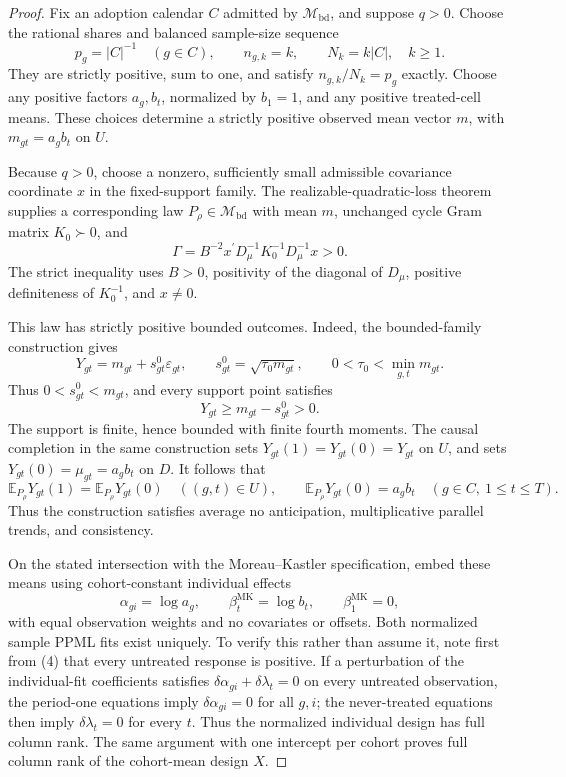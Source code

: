 \documentclass{article}
\begin{document}
\begin{proof}
Fix an adoption calendar \(C\) admitted by \(\mathcal M_{\mathrm{bd}}\), and suppose \(q>0\).  Choose the rational shares and balanced sample-size sequence
\[
p_g=|C|^{-1}\quad(g\in C),
\qquad
n_{g,k}=k,
\qquad
N_k=k|C|,
\quad k\ge1.                                                            \tag{1}
\]
They are strictly positive, sum to one, and satisfy
\(n_{g,k}/N_k=p_g\) exactly.  Choose any positive factors \(a_g,b_t\), normalized by \(b_1=1\), and any positive treated-cell means.  These choices determine a strictly positive observed mean vector \(m\), with
\(m_{gt}=a_gb_t\) on \(U\).

Because \(q>0\), choose a nonzero, sufficiently small admissible covariance coordinate \(x\) in the fixed-support family.  The realizable-quadratic-loss theorem supplies a corresponding law
\(P_\rho\in\mathcal M_{\mathrm{bd}}\) with mean \(m\), unchanged cycle Gram matrix \(K_0\succ0\), and
\[
\Gamma
=B^{-2}x^{\prime}D_\mu^{-1}K_0^{-1}D_\mu^{-1}x>0.                    \tag{2}
\]
The strict inequality uses \(B>0\), positivity of the diagonal of \(D_\mu\), positive definiteness of \(K_0^{-1}\), and \(x\ne0\).

This law has strictly positive bounded outcomes.  Indeed, the bounded-family construction gives
\[
Y_{gt}=m_{gt}+s^0_{gt}\varepsilon_{gt},
\qquad
s^0_{gt}=\sqrt{\tau_0m_{gt}},
\qquad
0<\tau_0<\min_{g,t}m_{gt}.                                               \tag{3}
\]
Thus \(0<s^0_{gt}<m_{gt}\), and every support point satisfies
\[
Y_{gt}\ge m_{gt}-s^0_{gt}>0.                                           \tag{4}
\]
The support is finite, hence bounded with finite fourth moments.  The causal completion in the same construction sets
\(Y_{gt}(1)=Y_{gt}(0)=Y_{gt}\) on \(U\), and sets
\(Y_{gt}(0)=\mu_{gt}=a_gb_t\) on \(D\).  It follows that
\[
\mathbb E_{P_\rho}Y_{gt}(1)=\mathbb E_{P_\rho}Y_{gt}(0)
\quad((g,t)\in U),
\qquad
\mathbb E_{P_\rho}Y_{gt}(0)=a_gb_t
\quad(g\in C,\ 1\le t\le T).                                         \tag{5}
\]
Thus the construction satisfies average no anticipation, multiplicative parallel trends, and consistency.

On the stated intersection with the Moreau--Kastler specification, embed these means using cohort-constant individual effects
\[
\alpha_{gi}=\log a_g,
\qquad
\beta_t^{\mathrm{MK}}=\log b_t,
\qquad
\beta_1^{\mathrm{MK}}=0,                                                \tag{6}
\]
with equal observation weights and no covariates or offsets.  Both normalized sample PPML fits exist uniquely.  To verify this rather than assume it, note first from (4) that every untreated response is positive.  If a perturbation of the individual-fit coefficients satisfies
\(\delta\alpha_{gi}+\delta\lambda_t=0\) on every untreated observation, the period-one equations imply
\(\delta\alpha_{gi}=0\) for all \(g,i\); the never-treated equations then imply
\(\delta\lambda_t=0\) for every \(t\).  Thus the normalized individual design has full column rank.  The same argument with one intercept per cohort proves full column rank of the cohort-mean design \(X\).


\end{proof}
\end{document}
